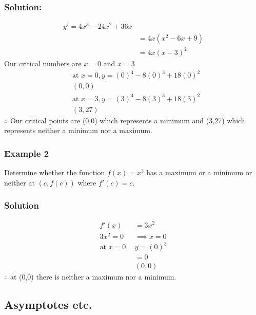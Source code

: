 \documentclass{article}
\begin{document}
\subsubsection*{Solution:}
\begin{align*}
    y'=4x^3-24x^2+36x\\
    &=4x(x^2-6x+9)\\
    &=4x(x-3)^2
\end{align*}
Our critical numbers are $x=0$ and $x=3$\\
\begin{align*}
    &\text{at } x=0, y=(0)^4-8(0)^3+18(0)^2\\
    &(0,0)\\
    &\text{at } x=3, y=(3)^4-8(3)^3+18(3)^2\\
    &(3,27)
\end{align*}
$\therefore$ Our critical points are (0,0) which represents a minimum and (3,27) which represents neither a minimum nor a maximum.
\subsubsection{Example 2}
Determine whether the function $f(x)=x^3$ has a maximum or a minimum or neither at $(c, f(c))$ where $f'(c)=c.$
\subsubsection*{Solution}
\begin{align*}
    f'(x)&=3x^2\\
    3x^2=0 &\implies x=0\\
    \text{at } x=0,& y=(0)^3\\
    &=0\\
    &(0,0)
\end{align*}
$\therefore$ at (0,0) there is neither a maximum nor a minimum.

\newpage
\subsection{Asymptotes etc.}
\end{document}
